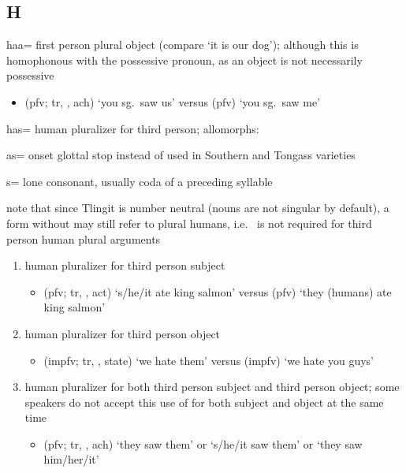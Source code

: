 
\subsection{H}\label{sec:alphalist-h}
\begin{morphdesc}[resume*=alphalist]
\item[haa=]\label{m:haa=}
	first person plural object
	(compare  ‘it is our dog’);
	although this is homophonous with the possessive pronoun,
		 as an object is not necessarily possessive
	\begin{itemize}
	\item	{} (pfv; tr, , ach) ‘you sg.\ saw us’\newline
		versus  (pfv) ‘you sg.\ saw me’
	\end{itemize}

\item[has=]\label{m:has=}
	human pluralizer for third person;
	\newline
	allomorphs:
	\begin{allolist}
	\item[as=]	onset glottal stop instead of  used in Southern and Tongass varieties
	\item[s=]	lone consonant, usually coda of a preceding syllable
	\end{allolist}
	note that since Tlingit is number neutral (nouns are not singular by default),
		a form without  may still refer to plural humans,
		i.e.\  is not required for third person human plural arguments
	\begin{enumerate}
	\item	human pluralizer for third person subject
		\begin{itemize}
		\item	{} (pfv; tr, ,  act) ‘s/he/it ate king salmon’\newline
			versus  (pfv) ‘they (humans) ate king salmon’
		\end{itemize}
	\item	human pluralizer for third person object
		\begin{itemize}
		\item	{} (impfv; tr, ,  state) ‘we hate them’\newline
			versus  (impfv) ‘we hate you guys’
		\end{itemize}
	\item	human pluralizer for both third person subject and third person object;
		some speakers do not accept this use of 
			for both subject and object at the same time
		\begin{itemize}
		\item	{} (pfv; tr, , ach) ‘they saw them’
			or ‘s/he/it saw them’ or ‘they saw him/her/it’
		\end{itemize}
	\end{enumerate}


\end{morphdesc}
